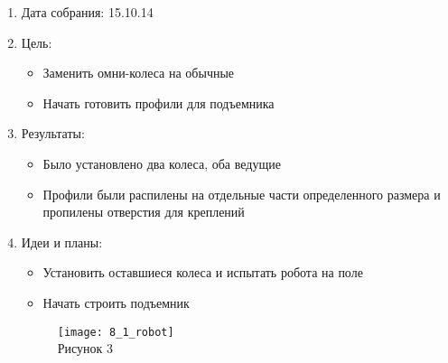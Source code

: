 
	\begin{enumerate}
	\item Дата собрания: 15.10.14
	\item Цель:
		\begin{itemize}
		\item Заменить омни-колеса на обычные
		\item Начать готовить профили для подъемника
		\end{itemize}
	\item Результаты:
		\begin{itemize}
		\item Было установлено два колеса, оба ведущие
		\item Профили были распилены на отдельные части определенного размера и пропилены отверстия для креплений
		\end{itemize}
	\item Идеи и планы:
		\begin{itemize}
		\item Установить оставшиеся колеса и испытать робота на поле
		\item Начать строить подъемник
		\end{itemize}
		\begin{figure} [h]
			\centering
			\begin{minipage}{0.3\linewidth}
				\texttt{[image: 8\_1\_robot]}\\ Рисунок 3
			\end{minipage}
		\end{figure}
	\end{enumerate}
\newpage
	
